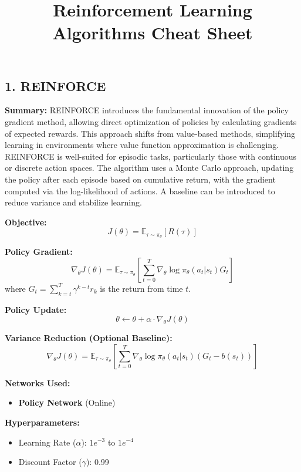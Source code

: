 \documentclass[a4paper,10pt]{article}
\title{\vspace{-4cm}Reinforcement Learning Algorithms Cheat Sheet}
\author{}
\date{}
\begin{document}
\maketitle
\footnotesize
\begin{multicols}{2}

\section*{1. REINFORCE}
\textbf{Summary:} REINFORCE introduces the fundamental innovation of the policy gradient method, allowing direct optimization of policies by calculating gradients of expected rewards. This approach shifts from value-based methods, simplifying learning in environments where value function approximation is challenging. REINFORCE is well-suited for episodic tasks, particularly those with continuous or discrete action spaces. The algorithm uses a Monte Carlo approach, updating the policy after each episode based on cumulative return, with the gradient computed via the log-likelihood of actions. A baseline can be introduced to reduce variance and stabilize learning.

\noindent \textbf{Objective:}
\[
J(\theta) = \mathbb{E}_{\tau \sim \pi_\theta} \left[ R(\tau) \right]
\]

\noindent \textbf{Policy Gradient:}
\[
\nabla_\theta J(\theta) = \mathbb{E}_{\tau \sim \pi_\theta} \left[ \sum_{t=0}^{T} \nabla_\theta \log \pi_\theta(a_t | s_t) G_t \right]
\]
where \( G_t = \sum_{k=t}^{T} \gamma^{k-t} r_k \) is the return from time \( t \).

\noindent \textbf{Policy Update:}
\[
\theta \leftarrow \theta + \alpha \cdot \nabla_\theta J(\theta)
\]

\noindent \textbf{Variance Reduction (Optional Baseline):}
\[
\nabla_\theta J(\theta) = \mathbb{E}_{\tau \sim \pi_\theta} \left[ \sum_{t=0}^{T} \nabla_\theta \log \pi_\theta(a_t | s_t) \left( G_t - b(s_t) \right) \right]
\]

\noindent \textbf{Networks Used:} 
\begin{itemize}
    \item \textbf{Policy Network} (Online)
\end{itemize}

\noindent \textbf{Hyperparameters:}
\begin{itemize}
    \item Learning Rate (\(\alpha\)): \(1e^{-3}\) to \(1e^{-4}\)
    \item Discount Factor (\(\gamma\)): 0.99
\end{itemize}


\end{multicols}
\end{document}
